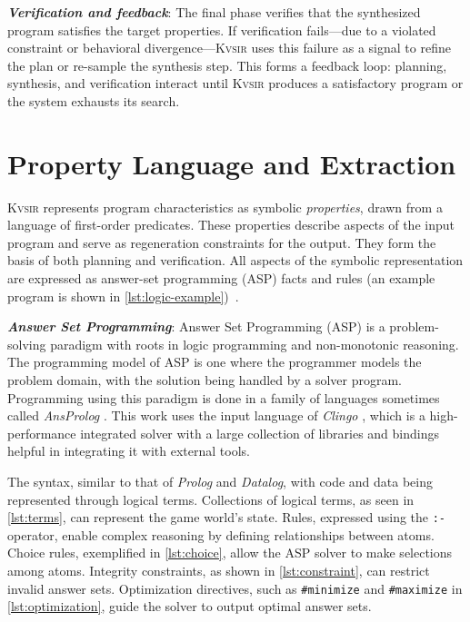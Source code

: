 \documentclass[nonacm,sigplan,review]{acmart}
\newcommand{\sys}{{\scshape Kv{\textalpha}sir}\xspace}
\newcommand{\heading}[1]{\vspace{2pt}\noindent\textbf{\emph{#1}}:\enspace}
\begin{document}
\heading{Verification and feedback}
The final phase verifies that the
synthesized program satisfies the target properties.
If verification fails---due to a violated constraint or behavioral divergence---\sys uses this
failure as a signal to refine the plan or re-sample the synthesis step.
This forms a feedback loop: planning, synthesis, and verification interact until \sys
produces a satisfactory program or the system exhausts its search.

\section{Property Language and Extraction}
\label{sec:dsl}

\sys represents program characteristics as symbolic \emph{properties}, drawn from a language of first-order predicates.
These properties describe aspects of the input program and serve as regeneration constraints for the output.
They form the basis of both planning and verification.
All aspects of the symbolic representation are expressed as answer-set programming (ASP) facts and rules (an example program is shown in \cref{lst:logic-example})~\cite{Eiter_2009}.

\heading{Answer Set Programming}
Answer Set Programming (ASP) \cite{Gelfond_2000, Eiter_2009} is a problem-solving paradigm with roots in logic programming and non-monotonic reasoning.
The programming 
model of ASP is one where the programmer models
the problem domain, with the solution being handled by a solver program.
Programming using this paradigm is done in a family of languages sometimes called \textit{AnsProlog} \cite{Gelfond_2002}.
This work uses the input language of \textit{Clingo} \cite{DBLP:journals/corr/GebserKKS14}, which 
is a high-performance integrated solver with a large collection of libraries and bindings helpful in integrating it with external tools.

The syntax, similar to that of \textit{Prolog} and \textit{Datalog}, with code and data being represented
through logical terms. Collections of logical terms, as seen in
\cref{lst:terms}, can represent the game world's state. Rules, expressed using
the \texttt{:-} operator, enable complex reasoning by defining relationships
between atoms. Choice rules, exemplified in \cref{lst:choice}, allow the ASP
solver to make selections among atoms. Integrity constraints, as shown in
\cref{lst:constraint}, can restrict invalid answer sets. Optimization
directives, such as \texttt{\#minimize} and \texttt{\#maximize} in
\cref{lst:optimization}, guide the solver to output optimal answer sets.
\end{document}
